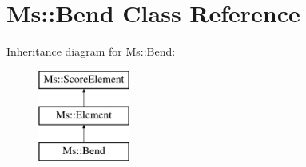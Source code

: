 \hypertarget{class_ms_1_1_bend}{}\section{Ms\+:\+:Bend Class Reference}
\label{class_ms_1_1_bend}
Inheritance diagram for Ms\+:\+:Bend\+:\begin{figure}[H]
\begin{center}
\leavevmode
\includegraphics[height=3.000000cm]{class_ms_1_1_bend}
\end{center}
\end{figure}

